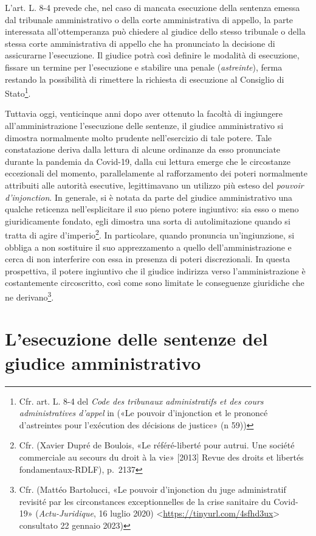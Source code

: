\documentclass[12pt,it,a4paper,]{report}
\begin{document}
L'art. L. 8-4 prevede che, nel caso di mancata esecuzione della sentenza
emessa dal tribunale amministrativo o della corte amministrativa di
appello, la parte interessata all'ottemperanza può chiedere al giudice
dello stesso tribunale o della stessa corte amministrativa di appello
che ha pronunciato la decisione di assicurarne l'esecuzione. Il giudice
potrà così definire le modalità di esecuzione, fissare un termine per
l'esecuzione e stabilire una penale (\emph{astreinte}), ferma restando
la possibilità di rimettere la richiesta di esecuzione al Consiglio di
Stato\footnote{Cfr. art. L. 8-4 del \emph{Code des tribunaux
  administratifs et des cours administratives d'appel} in ({«Le pouvoir
  d'injonction et le prononcé d'astreintes pour l'exécution des
  décisions de justice»} (n 59))}.

Tuttavia oggi, venticinque anni dopo aver ottenuto la facoltà di
ingiungere all'amministrazione l'esecuzione delle sentenze, il giudice
amministrativo si dimostra normalmente molto prudente nell'esercizio di
tale potere. Tale constatazione deriva dalla lettura di alcune ordinanze
da esso pronunciate durante la pandemia da Covid-19, dalla cui lettura
emerge che le circostanze eccezionali del momento, parallelamente al
rafforzamento dei poteri normalmente attribuiti alle autorità esecutive,
legittimavano un utilizzo più esteso del \emph{pouvoir d'injonction}. In
generale, si è notata da parte del giudice amministrativo una qualche
reticenza nell'esplicitare il suo pieno potere ingiuntivo: sia esso o
meno giuridicamente fondato, egli dimostra una sorta di autolimitazione
quando si tratta di agire d'imperio\footnote{Cfr. (Xavier Dupré de
  Boulois, {«Le référé-liberté pour autrui. Une société commerciale au
  secours du droit à la vie»} {[}2013{]} Revue des droits et libertés
  fondamentaux-RDLF), p.~2137}. In particolare, quando pronuncia
un'ingiunzione, si obbliga a non sostituire il suo apprezzamento a
quello dell'amministrazione e cerca di non interferire con essa in
presenza di poteri discrezionali. In questa prospettiva, il potere
ingiuntivo che il giudice indirizza verso l'amministrazione è
costantemente circoscritto, così come sono limitate le conseguenze
giuridiche che ne derivano\footnote{Cfr. (Mattéo Bartolucci, {«Le
  pouvoir d'injonction du juge administratif revisité par les
  circonstances exceptionnelles de la crise sanitaire du Covid-19»}
  (\emph{Actu-Juridique}, 16 luglio 2020)
  \textless{}\url{https://tinyurl.com/4sfhd3ux}\textgreater{} consultato
  22 gennaio 2023)}.

\hypertarget{lesecuzione-delle-sentenze-del-giudice-amministrativo}{%
\section{L'esecuzione delle sentenze del giudice
amministrativo}\label{lesecuzione-delle-sentenze-del-giudice-amministrativo}}
\end{document}
